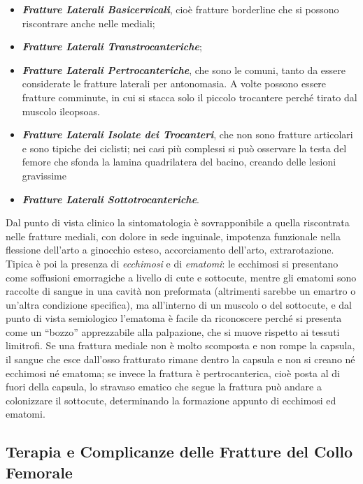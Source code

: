 \begin{itemize}
\item
  \textbf{\emph{Fratture Laterali Basicervicali}}, cioè fratture
  borderline che si possono riscontrare anche nelle mediali;
\item
  \textbf{\emph{Fratture Laterali Transtrocanteriche}};
\item
  \textbf{\emph{Fratture Laterali Pertrocanteriche}}, che sono le
  comuni, tanto da essere considerate le fratture laterali per
  antonomasia. A volte possono essere fratture comminute, in cui si
  stacca solo il piccolo trocantere perché tirato dal muscolo ileopsoas.
\item
  \textbf{\emph{Fratture Laterali Isolate dei Trocanteri}}, che non sono
  fratture articolari e sono tipiche dei ciclisti; nei casi più
  complessi si può osservare la testa del femore che sfonda la lamina
  quadrilatera del bacino, creando delle lesioni gravissime
\item
  \textbf{\emph{Fratture Laterali Sottotrocanteriche}}.
\end{itemize}

Dal punto di vista clinico la sintomatologia è sovrapponibile a quella
riscontrata nelle fratture mediali, con dolore in sede inguinale,
impotenza funzionale nella flessione dell'arto a ginocchio esteso,
accorciamento dell'arto, extrarotazione. Tipica è poi la presenza di
\emph{ecchimosi} e di \emph{ematomi}: le ecchimosi si presentano come
soffusioni emorragiche a livello di cute e sottocute, mentre gli ematomi
sono raccolte di sangue in una cavità non preformata (altrimenti sarebbe
un emartro o un'altra condizione specifica), ma all'interno di un
muscolo o del sottocute, e dal punto di vista semiologico l'ematoma è
facile da riconoscere perché si presenta come un ``bozzo'' apprezzabile
alla palpazione, che si muove rispetto ai tessuti limitrofi. Se una
frattura mediale non è molto scomposta e non rompe la capsula, il sangue
che esce dall'osso fratturato rimane dentro la capsula e non si creano
né ecchimosi né ematoma; se invece la frattura è pertrocanterica, cioè
posta al di fuori della capsula, lo stravaso ematico che segue la
frattura può andare a colonizzare il sottocute, determinando la
formazione appunto di ecchimosi ed ematomi.

\subsection{Terapia e Complicanze delle Fratture del Collo Femorale}


